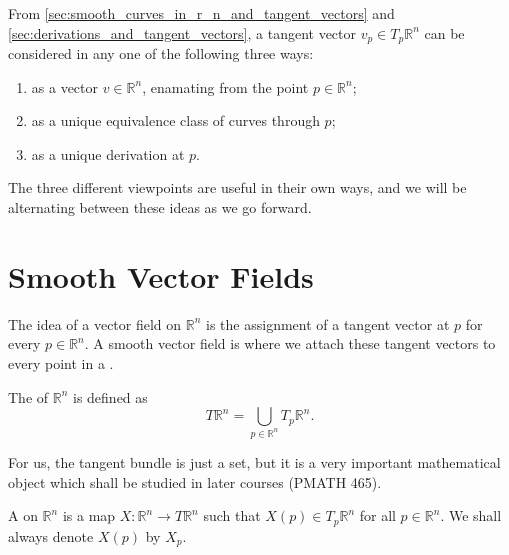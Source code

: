 \documentclass[notoc,notitlepage]{tufte-book}
\begin{document}
\begin{remark}
  From \cref{sec:smooth_curves_in_r_n_and_tangent_vectors} and
  \cref{sec:derivations_and_tangent_vectors}, a tangent vector $v_p \in T_p \mathbb{R}^n$ can
  be considered in any one of the following three ways:
  \begin{enumerate}
    \item as a vector $v \in \mathbb{R}^n$, enamating from the point $p \in \mathbb{R}^n$;
    \item as a unique equivalence class of curves through $p$;
    \item as a unique derivation at $p$.
  \end{enumerate}
  The three different viewpoints are useful in their own ways, and we will be alternating
  between these ideas as we go forward.
\end{remark}


\section{Smooth Vector Fields}%
\label{sec:smooth_vector_fields}

The idea of a vector field on $\mathbb{R}^n$ is the assignment of a tangent vector at $p$ for
every $p \in \mathbb{R}^n$. A smooth vector field is where we attach these tangent vectors to
every point in a .

\begin{defn}\label{defn:tangent_bundle}
  The  of $\mathbb{R}^n$ is defined as
  \begin{equation*}
    T \mathbb{R}^n = \bigcup_{p \in \mathbb{R}^n} T_p \mathbb{R}^n.
  \end{equation*}
\end{defn}

\begin{remark}
  For us, the tangent bundle is just a set, but it is a very important mathematical object
  which shall be studied in later courses (PMATH 465).
\end{remark}

\begin{defn}\label{defn:vector_field}
  A  on $\mathbb{R}^n$ is a map $X : \mathbb{R}^n \to T \mathbb{R}^n$
  such that $X(p) \in T_p \mathbb{R}^n$ for all $p \in \mathbb{R}^n$. We shall always denote
  $X(p)$ by $X_p$.
\end{defn}
\end{document}
